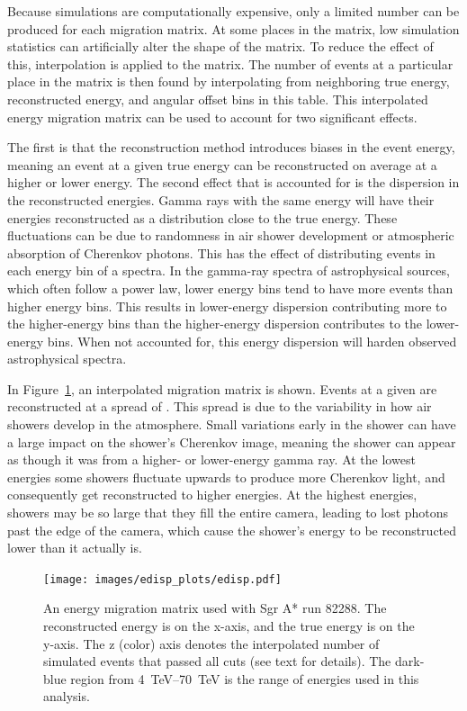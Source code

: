     Because simulations are computationally expensive, only a limited number can be produced for each migration matrix.
    At some places in the matrix, low simulation statistics can artificially alter the shape of the matrix.
    To reduce the effect of this, interpolation is applied to the matrix.
    The number of events at a particular place in the matrix is then found by interpolating from neighboring true energy, reconstructed energy, and angular offset bins in this table.
    This interpolated  energy migration matrix can be used to account for two significant effects.
    
    The first is that the reconstruction method introduces biases in the event energy, meaning an event at a given true energy can be reconstructed on average at a higher or lower energy.
    The second effect that is accounted for is the dispersion in the reconstructed energies.
    Gamma rays with the same energy will have their energies reconstructed as a distribution close to the true energy.
    These fluctuations can be due to randomness in air shower development or atmospheric absorption of Cherenkov photons.
    This has the effect of distributing events in each energy bin of a spectra.
    In the gamma-ray spectra of astrophysical sources, which often follow a power law, lower energy bins tend to have more events than higher energy bins.
    This results in lower-energy dispersion contributing more to the higher-energy bins than the higher-energy dispersion contributes to the lower-energy bins.
    When not accounted for, this energy dispersion will harden observed astrophysical spectra.
    
    In Figure~\ref{fig:migmatrix}, an interpolated migration matrix is shown.
    Events at a given \ETrue{} are reconstructed at a spread of \EReco{}.
    This spread is due to the variability in how air showers develop in the atmosphere.
    Small variations early in the shower can have a large impact on the shower's Cherenkov image, meaning the shower can appear as though it was from a higher- or lower-energy gamma ray.
    At the lowest \ETrue{} energies some showers fluctuate upwards to produce more Cherenkov light, and consequently get reconstructed to higher \EReco{} energies.
    At the highest \ETrue{} energies, showers may be so large that they fill the entire camera, leading to lost photons past the edge of the camera, which cause the shower's energy to be reconstructed lower than it actually is.

    \begin{figure}[!th]
      \centering
      \texttt{[image: images/edisp\_plots/edisp.pdf]}
      \caption[Energy Migration Matrix]{
        An energy migration matrix used with Sgr A* run 82288.
        The reconstructed energy is on the x-axis, and the true energy is on the y-axis.
        The z (color) axis denotes the interpolated number of simulated events that passed all cuts (see text for details).
        The dark-blue region from \SIrange{4}{70}{TeV} \EReco{} is the range of energies used in this analysis.
      }
      \label{fig:migmatrix}
    \end{figure}
  
